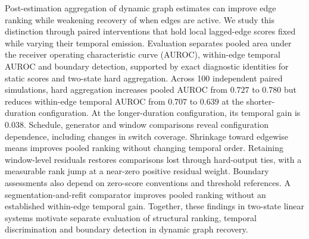 Post-estimation aggregation of dynamic graph estimates can improve edge
ranking while weakening recovery of when edges are active. We study this
distinction through paired interventions that hold local lagged-edge scores
fixed while varying their temporal emission. Evaluation separates pooled area under the receiver operating characteristic curve (AUROC),
within-edge temporal AUROC and boundary detection, supported by exact
diagnostic identities for static scores and two-state hard aggregation.
Across 100 independent paired simulations, hard aggregation increases pooled
AUROC from $0.727$ to $0.780$ but reduces within-edge temporal AUROC from
$0.707$ to $0.639$ at the shorter-duration configuration. At the longer-duration
configuration, its temporal gain is $0.038$. Schedule, generator and window
comparisons reveal configuration dependence, including changes in switch
coverage. Shrinkage toward edgewise means improves pooled ranking without
changing temporal order. Retaining window-level residuals restores comparisons
lost through hard-output ties, with a measurable rank jump at a near-zero
positive residual weight. Boundary assessments also depend on zero-score
conventions and threshold references. A segmentation-and-refit comparator
improves pooled ranking without an established within-edge temporal gain.
Together, these findings in two-state linear systems motivate separate
evaluation of structural ranking, temporal discrimination and boundary
detection in dynamic graph recovery.
